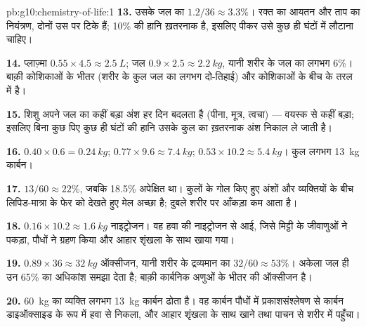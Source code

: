 \begin{solution}{pb:g10:chemistry-of-life:1}
\textbf{13.} उसके जल का $1.2/36 \approx 3.3\%$। रक्त का आयतन और ताप का
नियंत्रण, दोनों उस पर टिके हैं; 10\% की हानि ख़तरनाक है, इसलिए पीकर उसे
कुछ ही घंटों में लौटाना चाहिए।

\textbf{14.} प्लाज़्मा $0.55 \times 4.5 \approx \qty{2.5}{L}$; जल $0.9
\times 2.5 \approx \qty{2.2}{kg}$, यानी शरीर के जल का लगभग 6\%। बाक़ी
कोशिकाओं के भीतर (शरीर के कुल जल का लगभग दो-तिहाई) और कोशिकाओं के बीच के
तरल में है।

\textbf{15.} शिशु अपने जल का कहीं बड़ा अंश हर दिन बदलता है (पीना, मूत्र,
त्वचा) --- वयस्क से कहीं बड़ा; इसलिए बिना कुछ पिए कुछ ही घंटों की हानि
उसके कुल का ख़तरनाक अंश निकाल ले जाती है।

\textbf{16.}  $0.40 \times 0.6 = \qty{0.24}{kg}$; 
$0.77 \times 9.6 \approx \qty{7.4}{kg}$;  $0.53 \times 10.2
\approx \qty{5.4}{kg}$। कुल लगभग \qty{13}{kg} कार्बन।

\textbf{17.} $13/60 \approx 22\%$, जबकि 18.5\% अपेक्षित था। कुलों के
गोल किए हुए अंशों और व्यक्तियों के बीच लिपिड-मात्रा के फेर को देखते हुए
मेल अच्छा है; दुबले शरीर पर आँकड़ा कम आता है।

\textbf{18.} $0.16 \times 10.2 \approx \qty{1.6}{kg}$ नाइट्रोजन। वह हवा
की नाइट्रोजन से आई, जिसे मिट्टी के जीवाणुओं ने पकड़ा, पौधों ने ग्रहण
किया और आहार शृंखला के साथ खाया गया।

\textbf{19.} $0.89 \times 36 \approx \qty{32}{kg}$ ऑक्सीजन, यानी शरीर के
द्रव्यमान का $32/60 \approx 53\%$। अकेला जल ही उन 65\% का अधिकांश
समझा देता है; बाक़ी कार्बनिक अणुओं के भीतर की ऑक्सीजन है।

\textbf{20.} \qty{60}{kg} का व्यक्ति लगभग \qty{13}{kg} कार्बन ढोता है।
वह कार्बन पौधों में प्रकाशसंश्लेषण से कार्बन डाइऑक्साइड के रूप में हवा
से निकला, और आहार शृंखला के साथ खाने तथा पाचन से शरीर में पहुँचा।
\end{solution}
